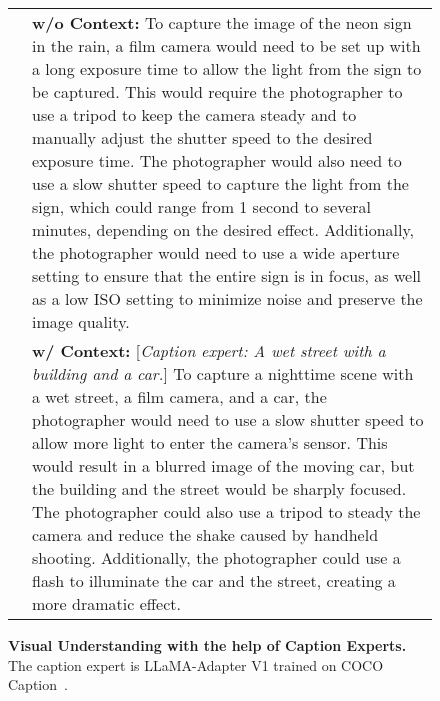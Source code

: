 \documentclass[10pt,twocolumn,letterpaper]{article}
\begin{document}
\begin{figure*}[thbp]
{\begin{tabular}{ll}
& \begin{minipage}[t]{\columnwidth}\textbf{w/o Context:} To capture the image of the neon sign in the rain, a film camera would need to be set up with a long exposure time to allow the light from the sign to be captured. This would require the photographer to use a tripod to keep the camera steady and to manually adjust the shutter speed to the desired exposure time. The photographer would also need to use a slow shutter speed to capture the light from the sign, which could range from 1 second to several minutes, depending on the desired effect.  Additionally, the photographer would need to use a wide aperture setting to ensure that the entire sign is in focus, as well as a low ISO setting to minimize noise and preserve the image quality.\end{minipage} \\
& \begin{minipage}[t]{\columnwidth}
\textbf{w/ Context:} [\textit{Caption expert: A wet street with a building and a car.}] To capture a nighttime scene with a wet street, a film camera, and a car, the photographer would need to use a slow shutter speed to allow more light to enter the camera's sensor. This would result in a blurred image of the moving car, but the building and the street would be sharply focused. The photographer could also use a tripod to steady the camera and reduce the shake caused by handheld shooting. Additionally, the photographer could use a flash to illuminate the car and the street, creating a more dramatic effect. \end{minipage}\\
\end{tabular}}
\caption{\textbf{Visual Understanding with the help of Caption Experts.} The caption expert is LLaMA-Adapter V1 trained on COCO Caption~\cite{chen2015microsoft}.}
\label{tab:integration_w_caption}
\end{figure*} \begin{figure*}[t]
\centering
\small
{}
\end{figure*}
\end{document}
